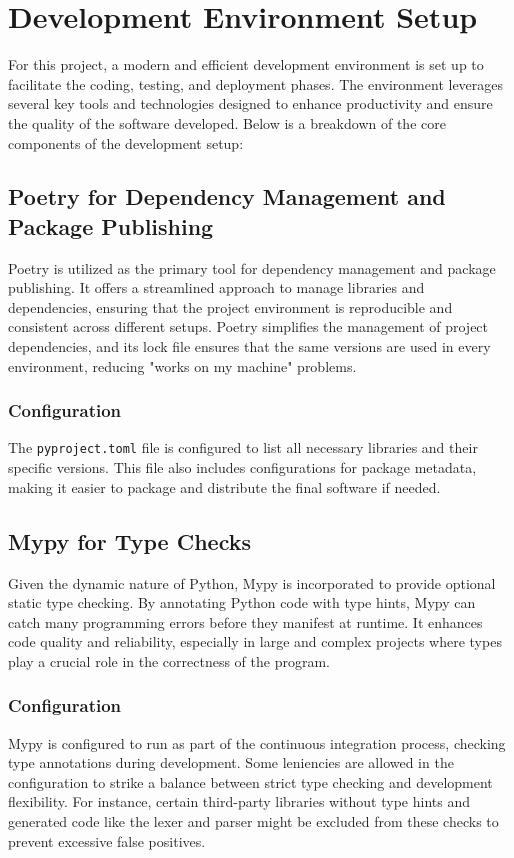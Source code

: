 \section{Development Environment Setup}

For this project, a modern and efficient development environment is set up to facilitate the coding, testing, and deployment phases. The environment leverages several key tools and technologies designed to enhance productivity and ensure the quality of the software developed. Below is a breakdown of the core components of the development setup:

\subsection{Poetry for Dependency Management and Package Publishing}

Poetry is utilized as the primary tool for dependency management and package publishing. It offers a streamlined approach to manage libraries and dependencies, ensuring that the project environment is reproducible and consistent across different setups. Poetry simplifies the management of project dependencies, and its lock file ensures that the same versions are used in every environment, reducing "works on my machine" problems.

\subsubsection{Configuration}

The \texttt{pyproject.toml} file is configured to list all necessary libraries and their specific versions. This file also includes configurations for package metadata, making it easier to package and distribute the final software if needed.

\subsection{Mypy for Type Checks}

Given the dynamic nature of Python, Mypy is incorporated to provide optional static type checking. By annotating Python code with type hints, Mypy can catch many programming errors before they manifest at runtime. It enhances code quality and reliability, especially in large and complex projects where types play a crucial role in the correctness of the program.

\subsubsection{Configuration}
Mypy is configured to run as part of the continuous integration process, checking type annotations during development. Some leniencies are allowed in the configuration to strike a balance between strict type checking and development flexibility. For instance, certain third-party libraries without type hints and generated code like the lexer and parser might be excluded from these checks to prevent excessive false positives.

